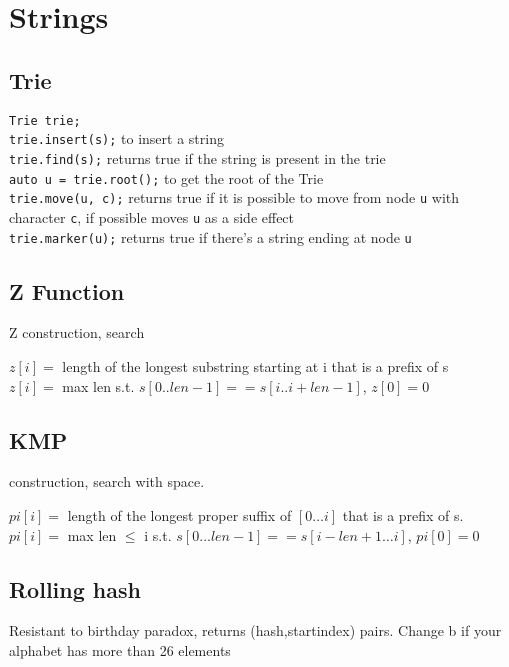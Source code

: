 \section{Strings}


\subsection{Trie}
\verb|Trie trie;| \\
\verb|trie.insert(s);|
to insert a string \\
\verb|trie.find(s);|
returns true if the string is present in the trie \\
\verb|auto u = trie.root();|
to get the root of the Trie \\
\verb|trie.move(u, c);|
returns true if it is possible to move from node \verb|u| with character \verb|c|,
if possible moves \verb|u| as a side effect \\
\verb|trie.marker(u);|
returns true if there's a string ending at node \verb|u| \\



\subsection{Z Function}
 Z construction,  search

\begin{flushleft}
$z[i] = $ length of the longest substring starting at i that is a prefix of s \\
$z[i] = $ max len s.t. $s[0..len-1] == s[i..i+len-1]$, $z[0] = 0$

\end{flushleft}


\subsection{KMP}
 construction,  search with  space.

$pi[i] =$ length of the longest proper suffix of $[0 \ldots i]$ that is a prefix of s. \\
$pi[i] =$ max len $\leq$ i s.t. $s[0\ldots len-1] == s[i-len+1 \ldots i]$, $pi[0]=0$


\subsection{Rolling hash}
Resistant to birthday paradox, returns (hash,startindex) pairs. Change b if your alphabet has more than 26 elements


